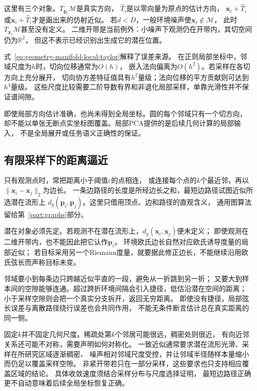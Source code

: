 这里有三个对象。$T_{\bm p_i}\mathcal M$是真实方向，
$\widehat T_i$是以零向量为原点的估计方向，
$\overline{\bm x}_i+\widehat T_i$或$\bm x_i+\widehat T_i$才是画出来的仿射近似。
若$d<D$，一般环境噪声使$\bm x_i\notin\mathcal M$，
此时$T_{\bm x_i}\mathcal M$甚至没有定义。
二维开带是当前例外：小噪声下观测仍在开带内，其切空间仍为$\mathbb R^2$，
但这不表示已经识别出生成它的潜在位置。

式~\eqref{eq:geometry-manifold-local-taylor}解释了误差来源。
在正则局部坐标中，邻域尺度为$h$时，切向位移通常为$O(h)$，
嵌入法向偏离为$O(h^2)$。若采样在各切方向上充分展开，
切向协方差特征值具有$h^2$量级；法向位移的平方贡献则可达到$h^4$量级。
这些尺度比较需要二阶导数有界和非退化局部采样，单靠光滑性并不保证谱间隙。


即使局部方向估计准确，也尚未得到全局坐标。圆的每个邻域只有一个切方向，
却不能以单张无断点实坐标图覆盖。局部PCA提供的是后续几何计算的局部输入，
不是全局展开或任务语义正确性的保证。

\subsection{有限采样下的距离逼近}
\label{sec:geometry-sampled-geodesic-distance}

只有观测点时，常把距离小于阈值$\varepsilon$的点相连，
或连接每个点的$k$个最近邻，再以$\lVert\bm x_i-\bm x_j\rVert_2$为边长。
一条边路径的长度是所经边长之和，最短边路径试图近似所选潜在流形上
$d_g(\bm p_i,\bm p_j)$。这里只借用顶点、边和路径的直观含义，
通用图算法留给第~\ref{part:graphs}部分。

潜在对象必须先定。若观测不在潜在流形上，$d_g(\bm x_i,\bm x_j)$便未定义；
即使观测在二维开带内，也不能因此把它认作$\bm p_i$。
环境欧氏边长自然对应欧氏诱导度量的局部近似；
若目标采用另一个Riemann度量，就要据此修正边长，不能继续沿用欧氏弦长而声称目标未变。

邻域要小到每条边只跨越近似平直的一段，避免从一折跳到另一折；
又要大到样本间的空隙能够连通。超过跨折环境间隔会引入捷径，低估沿潜在空间的距离；
小于采样空隙则会把一个真实分支拆开，返回无穷距离。
即使没有捷径，局部弦长误差与离散路径绕行误差也会共同作用，
不能无条件断言估计总在真实距离的同一侧。

固定$k$并不固定几何尺度。稀疏处第$k$个邻居可能很远，稠密处则很近，
有向近邻关系还可能不对称，需要声明如何对称化。
一致近似通常要求潜在流形光滑、采样在所研究区域逐渐稠密、
噪声相对邻域尺度受控，并让邻域半径随样本量缩小而仍足以覆盖采样空隙。
非紧开带若只在一部分采样，这些要求也只支持相应覆盖区域的结论。
具体收敛速度须结合采样分布与尺度选择证明，
最短边路径正确更不自动意味着后续全局坐标恢复正确。

